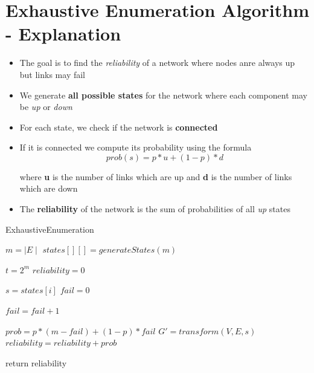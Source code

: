 \documentclass[12pt,letterpaper,titlepage,en-US]{article}
\begin{document}
\section{Exhaustive Enumeration Algorithm - Explanation}
\begin{itemize}


\item The goal is to find the \textit{reliability} of a network where nodes anre always up but links may fail

\item We generate \textbf{all possible states} for the network where each component may be \textit{up} or \textit{down}

\item For each state, we check if the network is \textbf{connected}

\item If it is connected we compute its probability using the formula
\begin{equation}
prob(s)=p*u + (1-p)*d
\end{equation}

where \textbf{u} is the number of links which are up and \textbf{d} is the number of links which are down


\item The \textbf{reliability} of the network is the sum of probabilities of all \textit{up} states





\end{itemize}








\begin{algorithm}[H]
    \caption{ExhaustiveEnumeration}
    \begin{algorithmic}[1]
      
      \State $m= \mid E \mid$
      \State $states[][] = generateStates(m)$
      
      \State $t = 2^m $
     \State $reliability=0$
      
      
      	
      	\State $ s = states[i]$
      	\State $fail=0$
      	
      			\State $fail=fail+1$
      			\EndIf
      			\EndFor
      			
      	\State $prob=p*(m-fail)+(1-p)*fail$
      	\State $G' = transform(V,E,s)$
      	\State $reliability=reliability+prob$
      	\EndIf
      	
      	
      \EndFor
      
        
      
     
     
      return reliability
        \EndProcedure
    \end{algorithmic}
    \end{algorithm}
\end{document}
